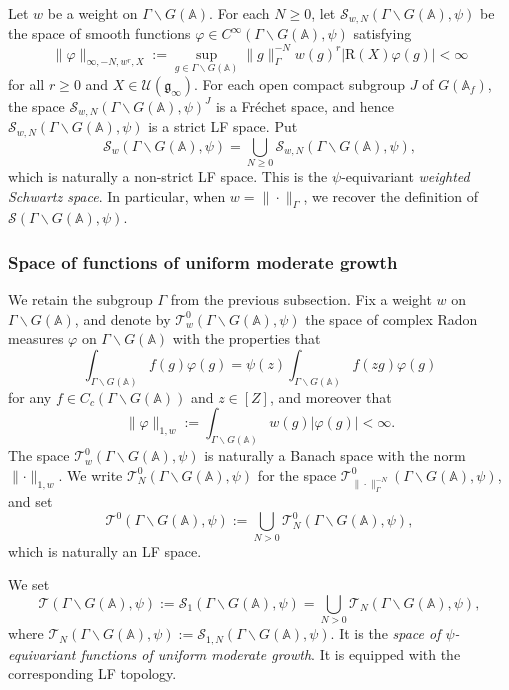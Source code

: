 \documentclass[letterpaper,11pt]{amsart}
\newcommand{\fg}{\mathfrak{g}}
\newcommand{\bA}{\mathbb{A}}
\newcommand{\cS}{\mathcal{S}}
\newcommand{\cT}{\mathcal{T}}
\newcommand{\cU}{\mathcal{U}}
\newcommand{\bs}{\backslash}
\newcommand{\<}{\negthickspace}
\providecommand{\abs}[1]{\lvert#1\rvert}
\providecommand{\aabs}[1]{\lVert#1\rVert}
\theoremstyle{definition}
\theoremstyle{plain}
\theoremstyle{remark}
\numberwithin{equation}{section}
\begin{document}
Let $w$ be a weight on $\Gamma \bs G(\bA)$. For each $N \ge 0$, let $\cS_{w, N}(\Gamma \backslash G(\bA), \psi)$ be the
space of smooth functions $\varphi \in C^\infty(\Gamma \backslash
G(\bA),\psi)$ satisfying
    \[
    \aabs{\varphi}_{\infty, -N, w^r, X} :=
    \sup_{g \in \Gamma \backslash G(\bA)} \aabs{g}_{\Gamma}^{-N} w(g)^{r}
    \abs{\mathrm{R}(X) \varphi(g)} < \infty
    \]
for all $r \geq 0$ and $X \in \cU(\fg_{\infty})$. For each open compact
subgroup $J$ of $G(\bA_{f})$, the space $\cS_{w, N}(\Gamma \backslash
G(\bA), \psi)^J$ is a Fr\'{e}chet space, and hence $\cS_{w, N}(\Gamma
\backslash G(\bA), \psi)$ is a strict LF space. Put
    \[
    \cS_{w}(\Gamma \backslash G(\bA), \psi)
    = \bigcup_{N \geq 0} \cS_{w, N}(\Gamma \backslash G(\bA),
    \psi),
    \]
which is naturally a non-strict LF space. This is the $\psi$-equivariant \emph{weighted Schwartz
space}. In particular, when $w=\| \cdot \|_\Gamma$, we recover the definition
of $\cS(\Gamma \backslash G(\bA),\psi)$.

\subsubsection{Space of functions of uniform moderate growth}

We retain the subgroup $\Gamma$ from the previous subsection. Fix a weight $w$ on $\Gamma \backslash G(\bA)$, and denote by $\cT^0_w(\Gamma
\backslash G(\bA),\psi)$ the space of complex Radon measures $\varphi$ on
$\Gamma \backslash G(\bA)$ with the properties that
    \[
    \int_{\Gamma \backslash G(\bA)} f(g) \varphi(g)  =
    \psi(z) \int_{\Gamma \backslash G(\bA)} f(zg) \varphi(g)
    \]
for any $f \in C_c(\Gamma \backslash G(\bA))$ and $z
\in [Z]$, and moreover that
    \[
        \aabs{ \varphi }_{1,w} :=
     \int_{\Gamma \backslash G(\bA)} w(g) \abs{ \varphi(g)} < \infty.
    \]
The space $\cT_w^0(\Gamma \backslash G(\bA),\psi)$ is naturally a Banach
space with the norm $\aabs{\cdot}_{1,w}$. We write $\cT^0_N(\Gamma \backslash G(\bA),\psi)$ for the space
$\cT^0_{\| \cdot \|^{-N}_\Gamma}(\Gamma \backslash G(\bA),\psi)$,
and set
    \[
    \cT^0(\Gamma \backslash G(\bA),\psi) :=
    \bigcup_{N>0} \cT^0_{N}(\Gamma \backslash G(\bA),\psi),
    \]
which is naturally an LF space.

We set
 \begin{equation*}
     \cT(\Gamma
\backslash G(\bA),\psi) := \cS_1(\Gamma \backslash G(\bA),\psi)=\bigcup_{N>0} \cT_N(\Gamma \backslash G(\bA),\psi),
 \end{equation*}
 where $\cT_N(\Gamma \backslash G(\bA), \psi):=\cS_{1,N}(\Gamma \backslash G(\bA),\psi)$.
It is the
\emph{space of $\psi$-equivariant functions of uniform moderate growth}. It is equipped with the corresponding LF topology.
\end{document}
